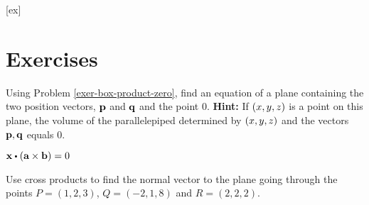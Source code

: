 [ex]
\section*{Exercises}

\begin{enumialphparenastyle}

  
\begin{ex} Using Problem \ref{exer-box-product-zero}, find an equation of a plane
containing the two position vectors, $\mbox{\bf p}$ and $\mbox{\bf q}$ and the
point $0$. 
\textbf{Hint: }If $\left(x,y,z\right) $ is a point on
this plane, the volume of the parallelepiped determined by $\left(
x,y,z\right) $ and the vectors $\mbox{\bf p},\mbox{\bf q}$ equals 0.
\begin{sol}
$\vect{x}\dotprod \tup{\vect{a}\times \vect{b}} =0$
\end{sol}
\end{ex}

\begin{ex} Use cross products to find the normal vector to the plane
  going through the points $P=(1,2,3)$, $Q=(-2,1,8)$ and $R=(2,2,2)$.
\end{ex}


\end{enumialphparenastyle}
